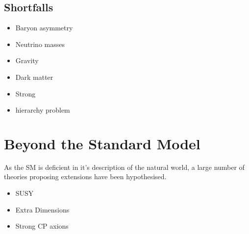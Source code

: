 \subsection{Shortfalls}


\begin{itemize}
\item Baryon asymmetry 
\item Neutrino masses
\item Gravity
\item Dark matter
\item Strong \CP 
\item hierarchy problem
\end{itemize}

\section{Beyond the Standard Model}
As the SM is deficient in it's description of the natural world, a large number of theories proposing extensions have been hypothesised.


{\color{Red}
\begin{itemize}
\item SUSY
\item Extra Dimensions
\item Strong CP axions 
\end{itemize}
}

